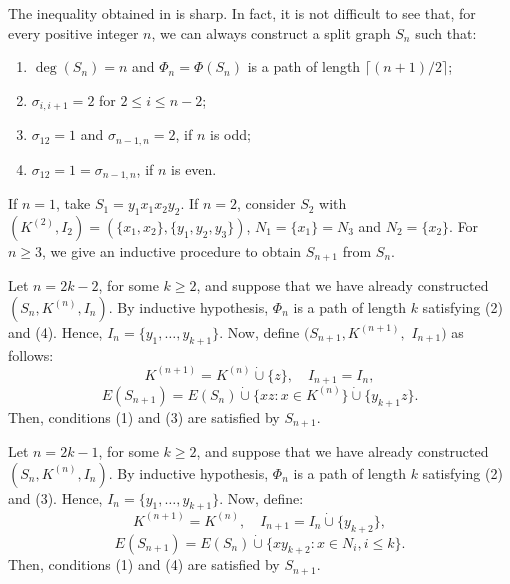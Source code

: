 \documentclass[11pt]{elsarticle}
\begin{document}
The inequality obtained in  is sharp. In fact, it is not difficult to see that, for every positive integer $n$, we can always construct a split graph $S_n$ such that:
\begin{enumerate}
	\item $\deg(S_n)=n$ and $\Phi_n=\Phi(S_n)$ is a path of length $\lceil (n+1)/2 \rceil$;
	
	\item $\sigma_{i,i+1}=2$ for $2\leq i\leq n-2$; 
	
	\item $\sigma_{12}=1$ and $\sigma_{n-1,n}=2$, if $n$ is odd;
	
	\item $\sigma_{12}=1=\sigma_{n-1,n}$, if $n$ is even.
\end{enumerate}

If $n=1$, take $S_1=y_1x_1x_2y_2$. If $n=2$, consider $S_2$ with $(K^{(2)}, I_2)=(\{x_1,x_2\}, \{y_1, y_2, y_3\})$, $N_1=\{x_1\}=N_3$ and $N_2=\{x_2\}$. For $n\geq 3$, we give an inductive procedure to obtain $S_{n+1}$ from $S_n$.

Let $n=2k-2$, for some $k\geq 2$, and suppose that we have already constructed $(S_n, K^{(n)}, I_n)$. By inductive hypothesis, $\Phi_n$ is a path of length $k$ satisfying (2) and (4). Hence, $I_n=\{y_1,\ldots,y_{k+1}\}$. Now, define $(S_{n+1}, K^{(n+1)},$ $I_{n+1})$ as follows: 
\[ K^{(n+1)}=K^{(n)}\dot{\cup}\{z\}, \quad I_{n+1}=I_n, \] 
\[E(S_{n+1})=E(S_n)\dot{\cup}\{xz:x\in K^{(n)}\}\dot{\cup}\{y_{k+1}z\}. \] 
Then, conditions (1) and (3) are satisfied by $S_{n+1}$.

Let $n=2k-1$, for some $k\geq 2$, and suppose that we have already constructed $(S_n, K^{(n)}, I_n)$. By inductive hypothesis, $\Phi_n$ is a path of length $k$ satisfying (2) and (3). Hence, $I_n=\{y_1,\ldots,y_{k+1}\}$. Now, define:
\[ K^{(n+1)}=K^{(n)}, \quad I_{n+1}=I_n\dot{\cup}\{y_{k+2}\}, \] 
\[E(S_{n+1})=E(S_n)\dot{\cup}\{xy_{k+2}:x\in N_i, i\leq k\}. \]
Then, conditions (1) and (4) are satisfied by $S_{n+1}$.


\end{document}
